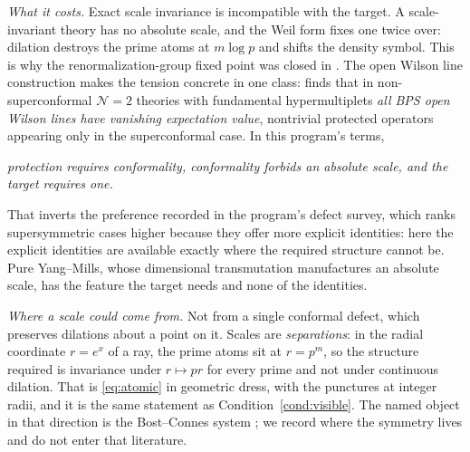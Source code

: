 \emph{What it costs.} Exact scale invariance is incompatible with the target. A
scale-invariant theory has no absolute scale, and the Weil form fixes one twice
over: dilation destroys the prime atoms at $m\log p$ and shifts the density
symbol. This is why the renormalization-group fixed point was closed in
\cite{ExclusionMap}. The open Wilson line construction makes the tension concrete
in one class: \cite{OWL} finds that in non-superconformal $\mathcal N=2$ theories
with fundamental hypermultiplets \emph{all BPS open Wilson lines have vanishing
expectation value}, nontrivial protected operators appearing only in the
superconformal case. In this program's terms,

\begin{center}
\emph{protection requires conformality, conformality forbids an absolute scale,
and the target requires one.}
\end{center}

That inverts the preference recorded in the program's defect survey, which ranks
supersymmetric cases higher because they offer more explicit identities: here the
explicit identities are available exactly where the required structure cannot be.
Pure Yang--Mills, whose dimensional transmutation manufactures an absolute scale,
has the feature the target needs and none of the identities.

\emph{Where a scale could come from.} Not from a single conformal defect, which
preserves dilations about a point on it. Scales are \emph{separations}: in the
radial coordinate $r=e^x$ of a ray, the prime atoms sit at $r=p^m$, so the
structure required is invariance under $r\mapsto pr$ for every prime and not under
continuous dilation. That is \eqref{eq:atomic} in geometric dress, with the
punctures at integer radii, and it is the same statement as
Condition~\ref{cond:visible}. The named object in that direction is the
Bost--Connes system \cite{BostConnes}; we record where the symmetry lives and do
not enter that literature.
